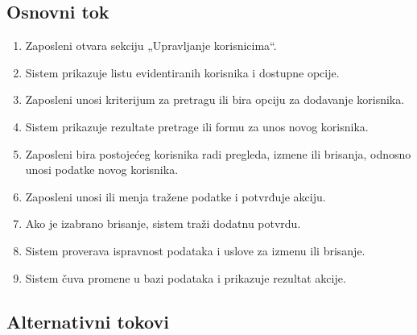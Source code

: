 \documentclass[12pt,a4paper]{article}
\begin{document}
\subsection*{Osnovni tok}

\begin{enumerate}
    \item Zaposleni otvara sekciju „Upravljanje korisnicima“.
    \item Sistem prikazuje listu evidentiranih korisnika i dostupne opcije.
    \item Zaposleni unosi kriterijum za pretragu ili bira opciju za dodavanje korisnika.
    \item Sistem prikazuje rezultate pretrage ili formu za unos novog korisnika.
    \item Zaposleni bira postojećeg korisnika radi pregleda, izmene ili brisanja,
    odnosno unosi podatke novog korisnika.
    \item Zaposleni unosi ili menja tražene podatke i potvrđuje akciju.
    \item Ako je izabrano brisanje, sistem traži dodatnu potvrdu.
    \item Sistem proverava ispravnost podataka i uslove za izmenu ili brisanje.
    \item Sistem čuva promene u bazi podataka i prikazuje rezultat akcije.
\end{enumerate}


\subsection*{Alternativni tokovi}
\end{document}
